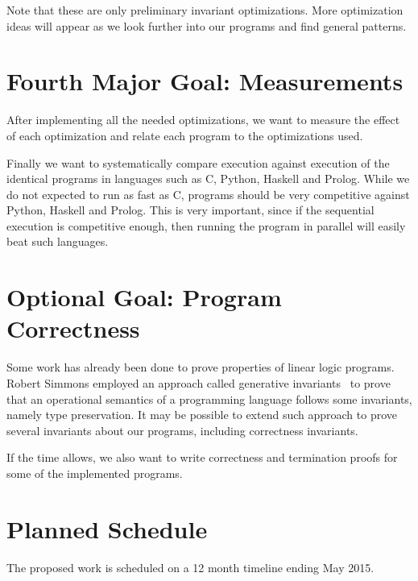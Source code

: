 Note that these are only preliminary invariant optimizations. More optimization ideas will appear
as we look further into our programs and find general patterns.

\section{Fourth Major Goal: Measurements}

After implementing all the needed optimizations, we want to measure the effect of each optimization
and relate each program to the optimizations used.

Finally we want to systematically compare \lang execution against execution of the identical programs
in languages such as C, Python, Haskell and Prolog. While we do not expected to run as fast as C,
\lang programs should be very competitive against Python, Haskell and Prolog. This is very important, since
if the sequential execution is competitive enough, then running the program in parallel will
easily beat such languages.

\section{Optional Goal: Program Correctness}

Some work has already been done to prove properties of linear logic programs.
Robert Simmons employed an approach called generative invariants~\cite{simmons:Thesis} to prove that an operational semantics of a programming
language follows some invariants, namely type preservation. It may be possible to extend such approach to
prove several invariants about our programs, including correctness invariants.

If the time allows, we also want to write correctness and termination proofs for some of the implemented \lang programs.

\section{Planned Schedule}

The proposed work is scheduled on a 12 month timeline ending May 2015.

